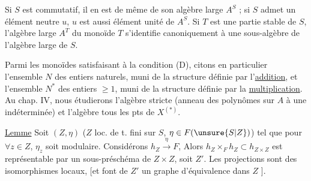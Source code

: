 Si $S$ est commutatif, il en est de même de son algèbre large $A^S$ ; si $S$ admet un élément neutre $u$, $u$ est aussi élément unité de $A^S$. Si $T$ est une partie stable de $S$, l'algèbre large $A^T$ du monoïde $T$ s'identifie canoniquement à une sous-algèbre de l'algèbre large de $S$.

Parmi les monoïdes satisfaisant à la condition (D), citons en particulier l'ensemble $N$ des entiers naturels, muni de la structure définie par l'\uline{addition}, et l'ensemble $N^*$ des entiers $\ge1$, muni de la structure définie par la \uline{multiplication}. Au chap. IV, nous étudierons l'algèbre stricte (anneau des polynômes sur $A$ à une indéterminée) et l'algèbre
tous les pts de $X^{(*)}$.


\uline{Lemme} Soit $(Z,\eta)$ ($Z$ loc. de t. fini sur $S$, $\eta\in F(\unsure{S|Z})$) tel que pour $\forall z\in Z$, $\eta_z$ soit modulaire. Considérons $h_Z\xrightarrow{\eta}F$, 
Alors $h_Z\times_F h_Z\subset h_{Z\times Z}$ est représentable par un sous-préschéma de $Z\times Z$, soit $Z'$. Les projections
sont des isomorphismes locaux, [et font de $Z'$ un  graphe d'équivalence dans $Z$ \unsure{$\ldots$}].


